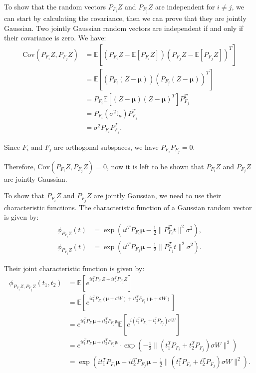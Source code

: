 \begin{answerenum}
    \item To show that the random vectors $P_{F_i}Z$ and $P_{F_j}Z$ are independent for $i \neq j$, we can start by calculating the covariance, then we can prove that they are jointly Gaussian. Two jointly Gaussian random vectors are independent if and only if their covariance is zero. We have:
        \begin{align*}
            \text{Cov}(P_{F_i}Z, P_{F_j}Z) &= \mathbb{E}[(P_{F_i}Z - \mathbb{E}[P_{F_i}Z])(P_{F_j}Z - \mathbb{E}[P_{F_j}Z])^T] \\
            &= \mathbb{E}[(P_{F_i}(Z - \boldsymbol{\mu}))(P_{F_j}(Z - \boldsymbol{\mu}))^T] \\
            &= P_{F_i}\mathbb{E}[(Z - \boldsymbol{\mu})(Z - \boldsymbol{\mu})^T]P_{F_j}^T \\
            &= P_{F_i}(\sigma^2\mathbb{I}_n)P_{F_j}^T \\
            &= \sigma^2 P_{F_i}P_{F_j}^T.
        \end{align*}

        Since $F_i$ and $F_j$ are orthogonal subspaces, we have $P_{F_i}P_{F_j} = 0$.

        Therefore, $\text{Cov}(P_{F_i}Z, P_{F_j}Z) = 0$, now it is left to be shown that $P_{F_i}Z$ and $P_{F_j}Z$ are jointly Gaussian.

        To show that $P_{F_i}Z$ and $P_{F_j}Z$ are jointly Gaussian, we need to use their characteristic functions. The characteristic function of a Gaussian random vector is given by:
        \begin{align*}
            \phi_{P_{F_i}Z}(t) &= \exp\left( i t^T P_{F_i}\boldsymbol{\mu} - \frac{1}{2} \|P_{F_i}^T t\|^2 \sigma^2 \right), \\
            \phi_{P_{F_j}Z}(t) &= \exp\left( i t^T P_{F_j}\boldsymbol{\mu} - \frac{1}{2} \|P_{F_j}^T t\|^2 \sigma^2 \right).
        \end{align*}

        Their joint characteristic function is given by:
        \begin{align*}
            \phi_{P_{F_i}Z, P_{F_j}Z}(t_1, t_2) &= \mathbb{E}\left[ e^{i t_1^T P_{F_i}Z + i t_2^T P_{F_j}Z} \right] \\
            &= \mathbb{E}\left[ e^{i t_1^T P_{F_i}(\boldsymbol{\mu} + \sigma W) + i t_2^T P_{F_j}(\boldsymbol{\mu} + \sigma W)} \right] \\
            &= e^{i t_1^T P_{F_i}\boldsymbol{\mu} + i t_2^T P_{F_j}\boldsymbol{\mu}} \mathbb{E}\left[ e^{i (t_1^T P_{F_i} + t_2^T P_{F_j}) \sigma W} \right] \\
            &= e^{i t_1^T P_{F_i}\boldsymbol{\mu} + i t_2^T P_{F_j}\boldsymbol{\mu}} \cdot \exp\left( -\frac{1}{2} \| (t_1^T P_{F_i} + t_2^T P_{F_j}) \sigma W \|^2 \right) \\
            &= \exp\left( i t_1^T P_{F_i}\boldsymbol{\mu} + i t_2^T P_{F_j}\boldsymbol{\mu} - \frac{1}{2} \| (t_1^T P_{F_i} + t_2^T P_{F_j}) \sigma W \|^2 \right).
        \end{align*}


\end{answerenum}
